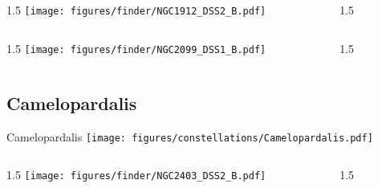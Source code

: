 \documentclass[final]{beamer}
\newlength{\colwidth}
\begin{document}
\begin{frame}[t]{}
  \begin{columns}[T]
    \begin{column}{1.5\colwidth}
      \centering
      \texttt{[image: figures/finder/NGC1912\_DSS2\_B.pdf]}
    \end{column}
    \begin{column}{1.5\colwidth}
      \Large
      
    \end{column}
  \end{columns}
  \vspace{\fill}
  \begin{columns}[T]
    \begin{column}{1.5\colwidth}
      \centering
      \texttt{[image: figures/finder/NGC2099\_DSS1\_B.pdf]}
    \end{column}
    \begin{column}{1.5\colwidth}
      \Large
      
    \end{column}
  \end{columns}
\end{frame}

\subsection{Camelopardalis}

\begin{frame}[t]{\LARGE Camelopardalis}
  \centering
  \texttt{[image: figures/constellations/Camelopardalis.pdf]}
\end{frame}


\begin{frame}[t]{}
  \begin{columns}[T]
    \begin{column}{1.5\colwidth}
      \centering
      \texttt{[image: figures/finder/NGC2403\_DSS2\_B.pdf]}
    \end{column}
    \begin{column}{1.5\colwidth}
      \Large
      
    \end{column}
  \end{columns}
  \vspace{\fill}
\end{frame}
\end{document}

